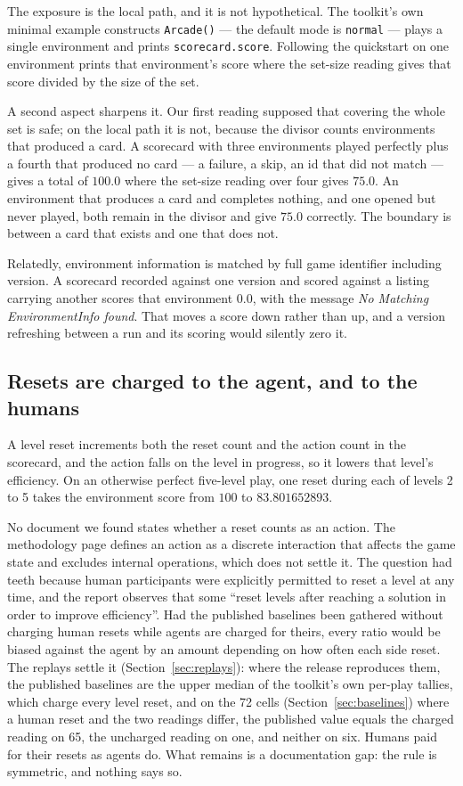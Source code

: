 \documentclass[11pt]{article}
\newcommand{\code}[1]{\texttt{#1}}
\begin{document}
The exposure is the local path, and it is not hypothetical. The toolkit's own
minimal example constructs \code{Arcade()} --- the default mode is
\code{normal} --- plays a single environment and prints \code{scorecard.score}.
Following the quickstart on one environment prints that environment's score
where the set-size reading gives that score divided by the size of the set.

A second aspect sharpens it. Our first reading supposed that covering the whole
set is safe; on the local path it is not, because the divisor counts
environments that produced a card. A scorecard with three environments played
perfectly plus a fourth that produced no card --- a failure, a skip, an id that
did not match --- gives a total of $100.0$ where the set-size reading over four gives $75.0$. An
environment that produces a card and completes nothing, and one opened but never
played, both remain in the divisor and give $75.0$ correctly. The boundary is
between a card that exists and one that does not.

Relatedly, environment information is matched by full game identifier including
version. A scorecard recorded against one version and scored against a listing
carrying another scores that environment $0.0$, with the message
\emph{No Matching EnvironmentInfo found}. That moves a score down rather than
up, and a version refreshing between a run and its scoring would silently zero
it.

\subsection{Resets are charged to the agent, and to the humans}
\label{sec:resets}

A level reset increments both the reset count and the action count in the
scorecard, and the action falls on the level in progress, so it lowers that
level's efficiency. On an otherwise perfect five-level play, one reset during
each of levels 2 to 5 takes the environment score from $100$ to
$83.801652893$.

No document we found states whether a reset counts as an action. The methodology
page defines an action as a discrete interaction that affects the game state and
excludes internal operations, which does not settle it. The question had teeth
because human participants were explicitly permitted to reset a level at any
time, and the report observes that some ``reset levels after reaching a solution
in order to improve efficiency''. Had the published baselines been gathered
without charging human resets while agents are charged for theirs, every ratio
would be biased against the agent by an amount depending on how often each side
reset. The replays settle it (Section~\ref{sec:replays}): where the release reproduces
them, the published baselines are the upper median of the toolkit's own
per-play tallies, which charge every level
reset, and on the 72 cells (Section~\ref{sec:baselines}) where a
human reset and the two readings differ, the published value equals the
charged reading on 65, the uncharged reading on one, and neither on six. Humans paid for their resets as agents do. What remains is
a documentation gap: the rule is symmetric, and nothing says so.
\end{document}
